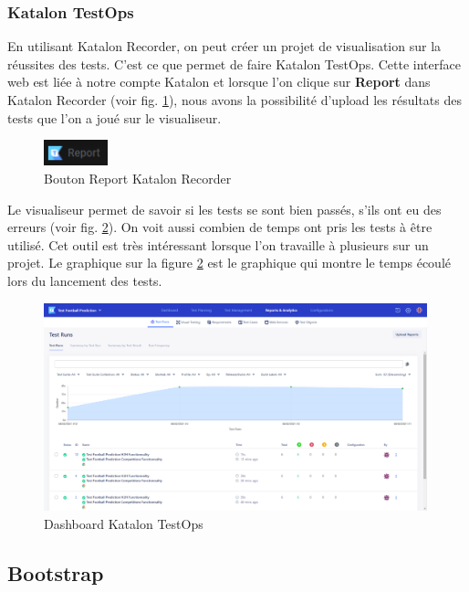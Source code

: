 \documentclass[a4paper,14pt]{extarticle}
\begin{document}
{\subsubsection{Katalon TestOps}

En utilisant Katalon Recorder, on peut créer un projet de visualisation sur la réussites des tests. C'est ce que permet de faire Katalon TestOps. Cette interface web est liée à notre compte Katalon et lorsque l'on clique sur \textbf{Report} dans Katalon Recorder (voir fig. \ref{fig:reportKatalonRecorder}), nous avons la possibilité d'upload les résultats des tests que l'on a joué sur le visualiseur.
\begin{figure}[htp]
    \centering
    \includegraphics[width=5em]{../img/reportKatalonRecorder.png}
    \caption{Bouton Report Katalon Recorder}
    \label{fig:reportKatalonRecorder}
\end{figure}

Le visualiseur permet de savoir si les tests se sont bien passés, s'ils ont eu des erreurs (voir fig. \ref{fig:dashboardTestOps}). On voit aussi combien de temps ont pris les tests à être utilisé. Cet outil est très intéressant lorsque l'on travaille à plusieurs sur un projet.
Le graphique sur la figure \ref{fig:dashboardTestOps} est le graphique qui montre le temps écoulé lors du lancement des tests.

\begin{figure}[htp]
    \centering
    \includegraphics[width=30em]{../img/dashboardTestOps.png}
    \caption{Dashboard Katalon TestOps}
    \label{fig:dashboardTestOps}
\end{figure}

\newpage

\subsection{Bootstrap}

}
\end{document}
